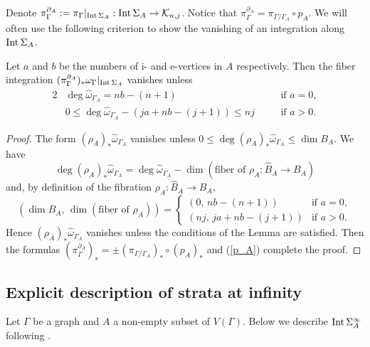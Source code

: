 Denote $\pi^{\partial_A}_{\Gamma} :=\pi_{\Gamma}|_{\mathrm{Int}\, \Sigma_A} : \mathrm{Int}\, \Sigma_A \to \mathcal{K}_{n ,j}$.
Notice that $\pi^{\partial_A}_{\Gamma}=\pi_{\Gamma / \Gamma_A} \circ p_A$.
We will often use the following criterion to show the vanishing of an integration along $\mathrm{Int}\, \Sigma_A$.


\begin{lem}\label{vanish_1}
Let $a$ and $b$ be the numbers of i- and e-vertices in $A$ respectively.
Then the fiber integration $(\pi^{\partial_A}_{\Gamma})_* \omega_{\Gamma}|_{\mathrm{Int}\, \Sigma_A}$ vanishes unless
\begin{alignat*}{2}
 &\deg \hat{\omega}_{\Gamma_A} = nb-(n+1) &\quad &\text{if } a=0, \\
 &0 \le \deg \hat{\omega}_{\Gamma_A} - (ja+nb-(j+1)) \le nj &\quad &\text{if } a>0.
\end{alignat*}
\end{lem}


\begin{proof}
The form $(\rho_A )_* \hat{\omega}_{\Gamma_A}$ vanishes unless
$0 \le \deg (\rho_A )_* \hat{\omega}_{\Gamma_A} \le \dim B_A$.
We have
\[
 \deg (\rho_A )_* \hat{\omega}_{\Gamma_A} = \deg \hat{\omega}_{\Gamma_A}
 - \dim (\text{fiber of }\rho_A : \hat{B}_A \to B_A )
\]
and, by definition of the fibration $\rho_A : \hat{B}_A \to B_A$,
\[
 (\dim B_A ,\, \dim (\text{fiber of }\rho_A )) =
 \begin{cases}
  (0,\, nb -(n+1))      & \text{if } a=0, \\
  (nj,\, ja +nb -(j+1)) & \text{if } a>0.
 \end{cases}
\]
Hence $(\rho_A )_* \hat{\omega}_{\Gamma_A}$ vanishes unless the conditions of the Lemma are satisfied.
Then the formulas $(\pi^{\partial_A}_{\Gamma})_* = \pm (\pi_{\Gamma / \Gamma_A})_* \circ (p_A )_*$ and (\ref{p_A})
complete the proof.
\end{proof}





\subsection{Explicit description of strata at infinity}\label{subsection_strata_infinity}


Let $\Gamma$ be a graph and $A$ a non-empty subset of $V(\Gamma )$.
Below we describe $\mathrm{Int}\, \Sigma^{\infty}_A$ following \cite{BottTaubes94, CCL02, Rossi_thesis, Watanabe07}.


